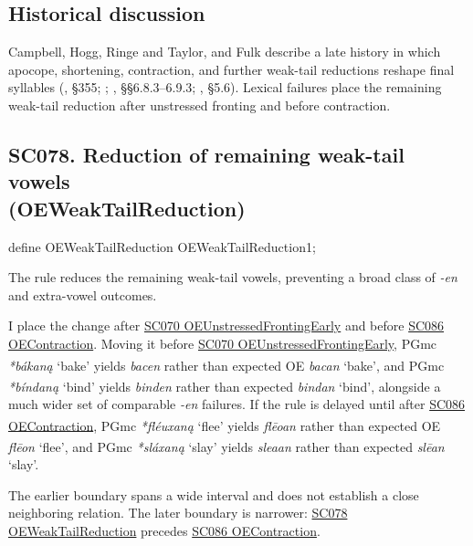 \documentclass[
  british,
  a4paper,
  openany]{book}
\providecommand{\Pred}[1]{\textsuperscript{\dag}\emph{#1}}
\providecommand{\Recon}[1]{\emph{*#1}}
{\catcode`→=\active \global\def→{\ensuremath{\rightarrow}}}
\providecommand{\texorpdfstring}[2]{#1}
\DeclareRobustCommand{\CAPRRuleHeading}[2]{%
  #1\texorpdfstring{\\(#2)}{ (#2)}%
}
\providecommand{\Pred}[1]{\textsuperscript{\dag}\emph{#1}}
\providecommand{\Recon}[1]{\emph{*#1}}
{\catcode`→=\active \global\def→{\ensuremath{\rightarrow}}}
\begin{document}
\subsection{Historical discussion}\label{historical-discussion-37}

Campbell, Hogg, Ringe and Taylor, and Fulk describe a late history in
which apocope, shortening, contraction, and further weak-tail reductions
reshape final syllables (, §355; ;
,
§§6.8.3--6.9.3; , §5.6).
Lexical failures place the remaining weak-tail reduction after
unstressed fronting and before contraction.

\subsection{\texorpdfstring{\CAPRRuleHeading{SC078. Reduction of remaining weak-tail vowels}{OEWeakTailReduction}}{}}\label{rule-OEWeakTailReduction}

\begin{ReaderFacingFoma}
define OEWeakTailReduction OEWeakTailReduction1;
\end{ReaderFacingFoma}

The rule reduces the remaining weak-tail vowels, preventing a broad
class of \emph{-en} and extra-vowel outcomes.

I place the change after \hyperref[rule-OEUnstressedFrontingEarly]{SC070
OEUnstressedFrontingEarly} and before
\hyperref[rule-OEContraction]{SC086 OEContraction}. Moving it before
\hyperref[rule-OEUnstressedFrontingEarly]{SC070
OEUnstressedFrontingEarly}, PGmc \Recon{bákaną} `bake' yields
\Pred{bacen} rather than expected OE \emph{bacan} `bake', and PGmc
\Recon{bíndaną} `bind' yields \Pred{binden} rather than expected
\emph{bindan} `bind', alongside a much wider set of comparable
\emph{-en} failures. If the rule is delayed until after
\hyperref[rule-OEContraction]{SC086 OEContraction}, PGmc
\Recon{fléuxaną} `flee' yields \Pred{flēoan} rather than expected OE
\emph{flēon} `flee', and PGmc \Recon{sláxaną} `slay' yields
\Pred{sleaan} rather than expected \emph{slēan} `slay'.

The earlier boundary spans a wide interval and does not establish a
close neighboring relation. The later boundary is narrower:
\hyperref[rule-OEWeakTailReduction]{SC078 OEWeakTailReduction} precedes
\hyperref[rule-OEContraction]{SC086 OEContraction}.
\end{document}
